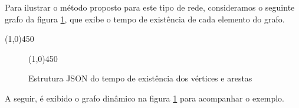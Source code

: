 Para ilustrar o método proposto para este tipo de rede, consideramos o seguinte grafo da figura \ref{fig:datatime}, que
exibe o tempo de existência de cada elemento do grafo.

\begin{center}
  \line(1,0){450}
\end{center}

\begin{figure}[htbp]
  \begin{center}
    \line(1,0){450}
  \end{center}
  \centering
  \caption{Estrutura JSON do tempo de existência dos vértices e arestas}
  \label{fig:datatime}
\end{figure}
\FloatBarrier

A seguir, é exibido o grafo dinâmico na figura \ref{fig:datatime} para acompanhar o exemplo.

